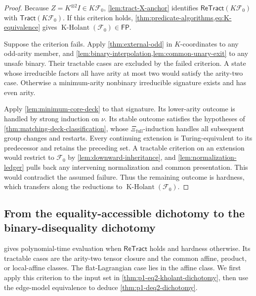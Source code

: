 \documentclass[11pt,letterpaper,onecolumn]{article}
\theoremstyle{plain}
\theoremstyle{definition}
\theoremstyle{remark}
\newcommand{\cF}{\mathcal F}
\newcommand{\KHolant}{\operatorname{K\text{-}Holant}}
\newcommand{\Tract}{\mathsf{Tract}}
\newcommand{\ReTract}{\mathsf{ReTract}}
\newcommand{\FP}{\mathsf{FP}}
\begin{document}
\begin{proof}
Because \(Z=K^{\otimes2}I\in K\cF_0\),
\cref{lem:tract-X-anchor} identifies
\(\ReTract(K\cF_0)\) with \(\Tract(K\cF_0)\).  If this
criterion holds, \cref{thm:predicate-algorithms,eq:K-equivalence} gives
\(\KHolant(\cF_0)\in\FP\).

Suppose the criterion fails. Apply \cref{thm:external-odd} in
\(K\)-coordinates to any odd-arity member, and
\cref{lem:binary-interpolation,lem:common-unary-exit} to any unsafe binary.
Their tractable cases are excluded by the failed criterion.
A state whose irreducible factors all have arity at most two would
satisfy the arity-two case. Otherwise a minimum-arity nonbinary
irreducible signature exists and has even arity.

Apply \cref{lem:minimum-core-deck} to that signature.
Its lower-arity outcome is handled by strong induction on \(\nu\).
Its stable outcome satisfies the hypotheses of
\cref{thm:matching-deck-classification}, whose \(\Xi_{\mathrm{full}}\)-induction
handles all subsequent group changes and restarts.
Every continuing extension is Turing-equivalent to its predecessor and
retains the preceding set. A tractable criterion on an extension would
restrict to \(\cF_0\) by \cref{lem:downward-inheritance}, and
\cref{lem:normalization-ledger} pulls back any intervening normalization
and common presentation. This would contradict the assumed failure.
Thus the remaining outcome is hardness, which transfers along the
reductions to \(\KHolant(\cF_0)\).
\end{proof}

\subsection{From the equality-accessible dichotomy to the binary-disequality dichotomy}

 gives polynomial-time evaluation
when \(\ReTract\) holds and hardness otherwise.  Its tractable cases
are the arity-two tensor closure and the common affine, product, or
local-affine classes. The flat-Lagrangian case lies in the affine class.
We first apply this criterion to the input set in
\cref{thm:p1-eq2-kholant-dichotomy}, then use the edge-model equivalence
to deduce \cref{thm:p1-deq2-dichotomy}.
\end{document}
